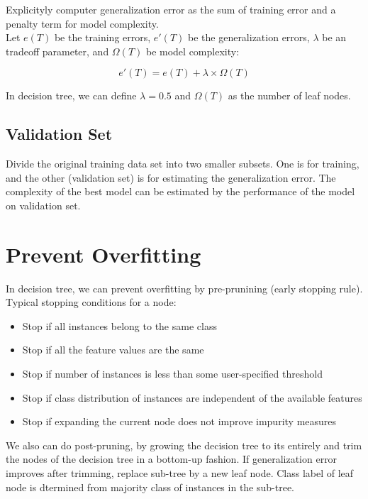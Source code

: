 \begin{multicols}{2}
\noindent Explicityly computer generalization error as the sum of training error and a penalty term for model complexity. \\

\noindent Let $e(T)$ be the training errors, $e'(T)$ be the generalization errors, $\lambda$ be an tradeoff parameter, and $\Omega(T)$ be model complexity:

$$e'(T)=e(T) + \lambda \times \Omega(T)$$

\noindent In decision tree, we can define $\lambda=0.5$ and $\Omega(T)$ as the number of leaf nodes. 

\subsection{Validation Set}

Divide the original training data set into two smaller subsets. One is for training, and the other (validation set) is for estimating the generalization error. The complexity of the best model can be estimated by the performance of the model on validation set. 

\section{Prevent Overfitting}

\noindent In decision tree, we can prevent overfitting by pre-prunining (early stopping rule). Typical stopping conditions for a node:

\begin{itemize}
    \item Stop if all instances belong to the same class
    \item Stop if all the feature values are the same
    \item Stop if number of instances is less than some user-specified threshold
    \item Stop if class distribution of instances are independent of the available features
    \item Stop if expanding the current node does not improve impurity measures
\end{itemize}

\noindent We also can do post-pruning, by growing the decision tree to its entirely and trim the nodes of the decision tree in a bottom-up fashion. If generalization error improves after trimming, replace sub-tree by a new leaf node. Class label of leaf node is dtermined from majority class of instances in the sub-tree. 


\end{multicols}

